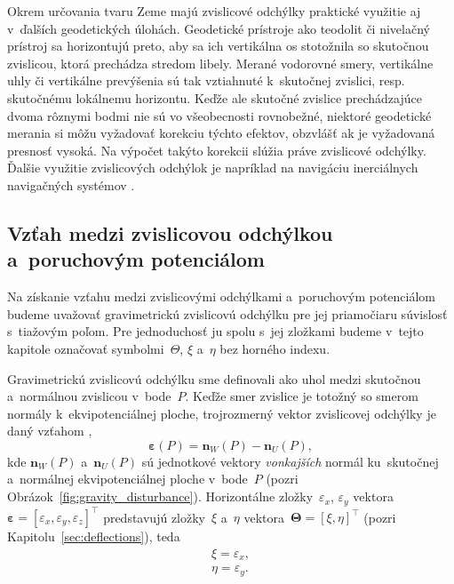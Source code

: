 \documentclass[a4paper, 12pt]{book}
\let\vec\mathbf
\begin{document}
Okrem určovania tvaru Zeme majú zvislicové odchýlky praktické využitie aj 
v~ďalších geodetických úlohách.  Geodetické prístroje ako teodolit či nivelačný 
prístroj sa horizontujú preto, aby sa ich vertikálna os stotožnila so skutočnou 
zvislicou, ktorá prechádza stredom libely.  Merané vodorovné smery, vertikálne 
uhly či vertikálne prevýšenia sú tak vztiahnuté k~skutočnej zvislici, 
resp. skutočnému lokálnemu horizontu.  Keďže ale skutočné zvislice 
prechádzajúce dvoma rôznymi bodmi nie sú vo všeobecnosti rovnobežné, niektoré 
geodetické merania si môžu vyžadovať korekciu týchto efektov, obzvlášť ak je 
vyžadovaná presnosť vysoká.  Na výpočet takýto korekcii slúžia práve zvislicové 
odchýlky.  Ďalšie využitie zvislicových odchýlok je napríklad na navigáciu 
inerciálnych navigačných systémov \parencite[pozri napríklad][]{Jekeli2000}.


\subsection{Vzťah medzi zvislicovou odchýlkou a~poruchovým potenciálom}
\label{sec:deflections_disturbing_potential}

Na získanie vzťahu medzi zvislicovými odchýlkami a~poruchovým potenciálom 
budeme uvažovať gravimetrickú zvislicovú odchýlku pre jej priamočiaru súvislosť 
s~tiažovým poľom.  Pre jednoduchosť ju spolu s~jej zložkami budeme v~tejto 
kapitole označovať symbolmi~$\Theta$, $\xi$ a~$\eta$ bez horného indexu.

Gravimetrickú zvislicovú odchýlku sme definovali ako uhol medzi skutočnou 
a~normálnou zvislicou v~bode~$P$.  Keďže smer zvislice je totožný so smerom 
normály k~ekvipotenciálnej ploche, trojrozmerný vektor zvislicovej odchýlky je 
daný vzťahom \parencite{SansoGeoidDetermination},
%
\begin{equation}
\label{eq:deflection_eps}
\boldsymbol\varepsilon(P) = \vec n_W(P) - \vec n_U(P){,}
\end{equation}
%
kde $\vec n_W(P)$ a~$\vec n_U(P)$ sú jednotkové vektory \emph{vonkajších} 
normál ku~skutočnej a~normálnej ekvipotenciálnej ploche v~bode~$P$ (pozri 
Obrázok~\ref{fig:gravity_disturbance}).  Horizontálne zložky~$\varepsilon_x$, 
$\varepsilon_y$ vektora~$\boldsymbol\varepsilon = [\varepsilon_x, 
\varepsilon_y, \varepsilon_z]^\top$ predstavujú zložky~$\xi$ a~$\eta$ 
vektora~$\boldsymbol\Theta = [\xi, \eta]^\top$ (pozri 
Kapitolu~\ref{sec:deflections}), teda
%
\begin{equation}
\label{eq:xi_eta_eps}
\begin{split}
\xi = \varepsilon_x{,}\\
\eta = \varepsilon_y{.}
\end{split}
\end{equation}
\end{document}
